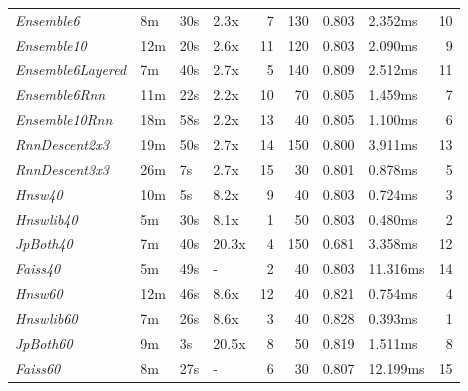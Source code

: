 \begin{tabular}{llllrrrlr}
\toprule
\midrule
\emph{Ensemble6} & 8m & 30s & 2.3x & 7 & 130 & 0.803 & 2.352ms & 10 \\
\emph{Ensemble10} & 12m & 20s & 2.6x & 11 & 120 & 0.803 & 2.090ms & 9 \\
\emph{Ensemble6Layered} & 7m & 40s & 2.7x & 5 & 140 & 0.809 & 2.512ms & 11 \\
\emph{Ensemble6Rnn} & 11m & 22s & 2.2x & 10 & 70 & 0.805 & 1.459ms & 7 \\
\emph{Ensemble10Rnn} & 18m & 58s & 2.2x & 13 & 40 & 0.805 & 1.100ms & 6 \\
\emph{RnnDescent2x3} & 19m & 50s & 2.7x & 14 & 150 & 0.800 & 3.911ms & 13 \\
\emph{RnnDescent3x3} & 26m & 7s & 2.7x & 15 & 30 & 0.801 & 0.878ms & 5 \\
\emph{Hnsw40} & 10m & 5s & 8.2x & 9 & 40 & 0.803 & 0.724ms & 3 \\
\emph{Hnswlib40} & 5m & 30s & 8.1x & 1 & 50 & 0.803 & 0.480ms & 2 \\
\emph{JpBoth40} & 7m & 40s & 20.3x & 4 & 150 & 0.681 & 3.358ms & 12 \\
\emph{Faiss40} & 5m & 49s & - & 2 & 40 & 0.803 & 11.316ms & 14 \\
\emph{Hnsw60} & 12m & 46s & 8.6x & 12 & 40 & 0.821 & 0.754ms & 4 \\
\emph{Hnswlib60} & 7m & 26s & 8.6x & 3 & 40 & 0.828 & 0.393ms & 1 \\
\emph{JpBoth60} & 9m & 3s & 20.5x & 8 & 50 & 0.819 & 1.511ms & 8 \\
\emph{Faiss60} & 8m & 27s & - & 6 & 30 & 0.807 & 12.199ms & 15 \\
\bottomrule
\end{tabular}
